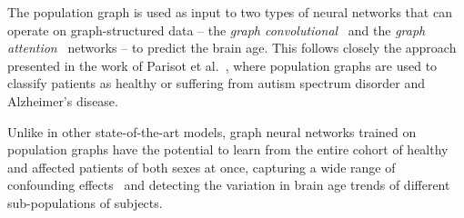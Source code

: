 The population graph is used as input to two types of neural networks that can operate on graph-structured data – the \textit{graph convolutional}~\cite{kipf2017semi} and the \textit{graph attention}~\cite{velickovic2018graph} networks – to predict the brain age. This follows closely the approach presented in the work of Parisot et al.~\cite{parisot2017spectral,parisot2018disease}, where population graphs are used to classify patients as healthy or suffering from autism spectrum disorder and Alzheimer's disease.


Unlike in other state-of-the-art models, graph neural networks trained on population graphs have the potential to learn from the entire cohort of healthy and affected patients of both sexes at once, capturing a wide range of confounding effects~\cite{ruigrok2014meta} and detecting the variation in brain age trends of different sub-populations of subjects. 




